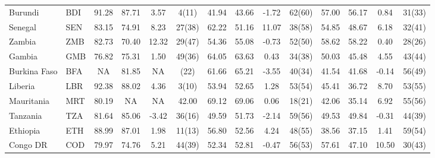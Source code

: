 {\begin{longtable}{m{2.3cm}lcccc|cccc|cccc}
Burundi                           & BDI           & 91.28            & 87.71              & 3.57             & 4(11)            & 41.94    & 43.66      & -1.72    & 62(60)   & 57.00           & 56.17             & 0.84            & 31(33)          \\
Senegal                           & SEN           & 83.15            & 74.91              & 8.23             & 27(38)           & 62.22    & 51.16      & 11.07    & 38(58)   & 54.85           & 48.67             & 6.18            & 32(41)          \\
Zambia                            & ZMB           & 82.73            & 70.40              & 12.32            & 29(47)           & 54.36    & 55.08      & -0.73    & 52(50)   & 58.62           & 58.22             & 0.40            & 28(26)          \\
Gambia                            & GMB           & 76.82            & 75.31              & 1.50             & 49(36)           & 64.05    & 63.63      & 0.43     & 34(38)   & 50.03           & 45.48             & 4.55            & 43(44)          \\
Burkina Faso                      & BFA           & NA               & 81.85              & NA               & (22)             & 61.66    & 65.21      & -3.55    & 40(34)   & 41.54           & 41.68             & -0.14           & 56(49)          \\
Liberia                           & LBR           & 92.38            & 88.02              & 4.36             & 3(10)            & 53.94    & 52.65      & 1.28     & 53(54)   & 45.41           & 36.72             & 8.70            & 53(55)          \\
Mauritania                        & MRT           & 80.19            & NA                 & NA               & 42.00            & 69.12    & 69.06      & 0.06     & 18(21)   & 42.06           & 35.14             & 6.92            & 55(56)          \\
Tanzania      & TZA           & 81.64            & 85.06              & -3.42            & 36(16)           & 49.59    & 51.73      & -2.14    & 59(56)   & 49.53           & 49.84             & -0.31           & 44(39)          \\
Ethiopia                          & ETH           & 88.99            & 87.01              & 1.98             & 11(13)           & 56.80    & 52.56      & 4.24     & 48(55)   & 38.56           & 37.15             & 1.41            & 59(54)          \\
Congo DR & COD           & 79.97            & 74.76              & 5.21             & 44(39)           & 52.34    & 52.81      & -0.47    & 56(53)   & 57.61           & 47.10             & 10.50           & 30(43)          \\

\end{longtable}}
